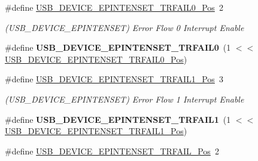 \begin{DoxyCompactItemize}
\item 
\hypertarget{group___s_a_m_l21___u_s_b_ga5babc1d61845de0e212410e813cc707d}{}\#define \hyperlink{group___s_a_m_l21___u_s_b_ga5babc1d61845de0e212410e813cc707d}{U\+S\+B\+\_\+\+D\+E\+V\+I\+C\+E\+\_\+\+E\+P\+I\+N\+T\+E\+N\+S\+E\+T\+\_\+\+T\+R\+F\+A\+I\+L0\+\_\+\+Pos}~2\label{group___s_a_m_l21___u_s_b_ga5babc1d61845de0e212410e813cc707d}

\begin{DoxyCompactList}\small\item\em (U\+S\+B\+\_\+\+D\+E\+V\+I\+C\+E\+\_\+\+E\+P\+I\+N\+T\+E\+N\+S\+E\+T) Error Flow 0 Interrupt Enable \end{DoxyCompactList}\item 
\hypertarget{group___s_a_m_l21___u_s_b_gafba4f57e01429ac06940c0c6de543217}{}\#define {\bfseries U\+S\+B\+\_\+\+D\+E\+V\+I\+C\+E\+\_\+\+E\+P\+I\+N\+T\+E\+N\+S\+E\+T\+\_\+\+T\+R\+F\+A\+I\+L0}~(1 $<$$<$ \hyperlink{group___s_a_m_l21___u_s_b_ga5babc1d61845de0e212410e813cc707d}{U\+S\+B\+\_\+\+D\+E\+V\+I\+C\+E\+\_\+\+E\+P\+I\+N\+T\+E\+N\+S\+E\+T\+\_\+\+T\+R\+F\+A\+I\+L0\+\_\+\+Pos})\label{group___s_a_m_l21___u_s_b_gafba4f57e01429ac06940c0c6de543217}

\item 
\hypertarget{group___s_a_m_l21___u_s_b_ga1adb76d45620358d886b0cb2d8865017}{}\#define \hyperlink{group___s_a_m_l21___u_s_b_ga1adb76d45620358d886b0cb2d8865017}{U\+S\+B\+\_\+\+D\+E\+V\+I\+C\+E\+\_\+\+E\+P\+I\+N\+T\+E\+N\+S\+E\+T\+\_\+\+T\+R\+F\+A\+I\+L1\+\_\+\+Pos}~3\label{group___s_a_m_l21___u_s_b_ga1adb76d45620358d886b0cb2d8865017}

\begin{DoxyCompactList}\small\item\em (U\+S\+B\+\_\+\+D\+E\+V\+I\+C\+E\+\_\+\+E\+P\+I\+N\+T\+E\+N\+S\+E\+T) Error Flow 1 Interrupt Enable \end{DoxyCompactList}\item 
\hypertarget{group___s_a_m_l21___u_s_b_gaf9ac629042c06c15fc8ac23d502a7474}{}\#define {\bfseries U\+S\+B\+\_\+\+D\+E\+V\+I\+C\+E\+\_\+\+E\+P\+I\+N\+T\+E\+N\+S\+E\+T\+\_\+\+T\+R\+F\+A\+I\+L1}~(1 $<$$<$ \hyperlink{group___s_a_m_l21___u_s_b_ga1adb76d45620358d886b0cb2d8865017}{U\+S\+B\+\_\+\+D\+E\+V\+I\+C\+E\+\_\+\+E\+P\+I\+N\+T\+E\+N\+S\+E\+T\+\_\+\+T\+R\+F\+A\+I\+L1\+\_\+\+Pos})\label{group___s_a_m_l21___u_s_b_gaf9ac629042c06c15fc8ac23d502a7474}

\item 
\hypertarget{group___s_a_m_l21___u_s_b_ga2c7e0bcecd62a0b34cfe393b85e4ebe5}{}\#define \hyperlink{group___s_a_m_l21___u_s_b_ga2c7e0bcecd62a0b34cfe393b85e4ebe5}{U\+S\+B\+\_\+\+D\+E\+V\+I\+C\+E\+\_\+\+E\+P\+I\+N\+T\+E\+N\+S\+E\+T\+\_\+\+T\+R\+F\+A\+I\+L\+\_\+\+Pos}~2\label{group___s_a_m_l21___u_s_b_ga2c7e0bcecd62a0b34cfe393b85e4ebe5}


\end{DoxyCompactItemize}
